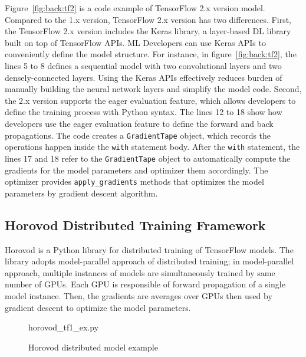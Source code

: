 Figure~\ref{fig:back:tf2} is a code example of TensorFlow 2.x version model.
Compared to the 1.x version, TensorFlow 2.x version has two differences.
First, the TensorFlow 2.x version includes the Keras library, a layer-based
DL library built on top of TensorFlow APIs.
ML Developers can use Keras APIs to conveniently define the model structure.
For instance, in figure~\ref{fig:back:tf2},
the lines 5 to 8 defines a sequential model with two convolutional layers and
two densely-connected layers.
Using the Keras APIs effectively reduces burden of manually building the neural
network layers and simplify the model code.
Second, the 2.x version supports the eager evaluation feature, which allows
developers to define the training process with Python syntax.
The lines 12 to 18 show how developers use the eager evaluation feature
to define the forward and back propagations. 
The code creates a {\tt GradientTape} object, which records the operations
happen inside the {\tt with} statement body.
After the {\tt with} statement, the lines 17 and 18 refer to the 
{\tt GradientTape} object to automatically compute the gradients 
for the model parameters and optimizer them accordingly.
The optimizer provides {\tt apply\_gradients} methods that optimizes 
the model parameters by gradient descent algorithm. 

\subsection{Horovod Distributed Training Framework}



Horovod is a Python library for distributed training of TensorFlow models.
The library adopts model-parallel approach of distributed training;
in model-parallel approach, multiple instances of models are simultaneously
trained by same number of GPUs.
Each GPU is responsible of forward propagation of a single model instance.
Then, the gradients are averages over GPUs then used by gradient descent
to optimize the model parameters. 

\begin{figure}[ht!]
 
{horovod_tf1_ex.py}
  \caption{Horovod distributed model example}
\label{fig:back:hvd1} 
\end{figure}

